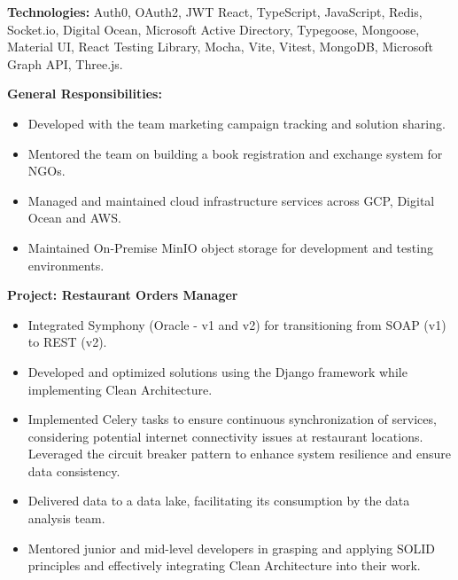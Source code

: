 \documentclass[10pt,a4paper]{altacv}
\begin{document}
\textbf{Technologies:} Auth0, OAuth2, JWT React, TypeScript, JavaScript, Redis, Socket.io, Digital Ocean, Microsoft Active Directory, Typegoose, Mongoose, Material UI, React Testing Library, Mocha, Vite, Vitest, MongoDB, Microsoft Graph API, Three.js.

\vspace{5mm}

\textbf{General Responsibilities:}
\begin{itemize}
    \setlength{\itemindent}{0.5em}
    \item[--] Developed with the team marketing campaign tracking and solution sharing.
    \item[--] Mentored the team on building a book registration and exchange system for NGOs.
    \item[--] Managed and maintained cloud infrastructure services across GCP, Digital Ocean and AWS.
    \item[--] Maintained On-Premise MinIO object storage for development and testing environments.
\end{itemize}


\textbf{Project: Restaurant Orders Manager}
\begin{itemize}
    \setlength{\itemindent}{0.5em}
    \item[--] Integrated Symphony (Oracle - v1 and v2) for transitioning from SOAP (v1) to REST (v2).
    \item[--] Developed and optimized solutions using the Django framework while implementing Clean Architecture.
    \item[--] Implemented Celery tasks to ensure continuous synchronization of services, considering potential internet connectivity issues at restaurant locations. Leveraged the circuit breaker pattern to enhance system resilience and ensure data consistency.
    \item[--] Delivered data to a data lake, facilitating its consumption by the data analysis team.
    \item[--] Mentored junior and mid-level developers in grasping and applying SOLID principles and effectively integrating Clean Architecture into their work.
\end{itemize}
\end{document}

